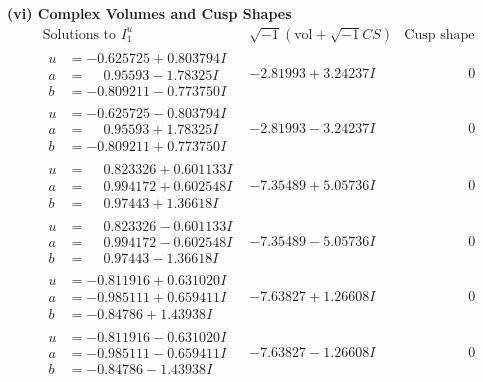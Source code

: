 \documentclass[1p]{elsarticle_modified}
\theoremstyle{definition}
\newcommand{\I}{\sqrt{-1}}
\begin{document}
\newpage\flushleft \textbf{(vi) Complex Volumes and Cusp Shapes}
$$\begin{array}{c|c|c}  
\text{Solutions to }I^u_{1}& \I (\text{vol} + \sqrt{-1}CS) & \text{Cusp shape}\\
 \hline 
\begin{aligned}
u &= -0.625725 + 0.803794 I \\
a &= \phantom{-}0.95593 - 1.78325 I \\
b &= -0.809211 - 0.773750 I\end{aligned}
 & -2.81993 + 3.24237 I & \phantom{-0.000000 } 0 \\ \hline\begin{aligned}
u &= -0.625725 - 0.803794 I \\
a &= \phantom{-}0.95593 + 1.78325 I \\
b &= -0.809211 + 0.773750 I\end{aligned}
 & -2.81993 - 3.24237 I & \phantom{-0.000000 } 0 \\ \hline\begin{aligned}
u &= \phantom{-}0.823326 + 0.601133 I \\
a &= \phantom{-}0.994172 + 0.602548 I \\
b &= \phantom{-}0.97443 + 1.36618 I\end{aligned}
 & -7.35489 + 5.05736 I & \phantom{-0.000000 } 0 \\ \hline\begin{aligned}
u &= \phantom{-}0.823326 - 0.601133 I \\
a &= \phantom{-}0.994172 - 0.602548 I \\
b &= \phantom{-}0.97443 - 1.36618 I\end{aligned}
 & -7.35489 - 5.05736 I & \phantom{-0.000000 } 0 \\ \hline\begin{aligned}
u &= -0.811916 + 0.631020 I \\
a &= -0.985111 + 0.659411 I \\
b &= -0.84786 + 1.43938 I\end{aligned}
 & -7.63827 + 1.26608 I & \phantom{-0.000000 } 0 \\ \hline\begin{aligned}
u &= -0.811916 - 0.631020 I \\
a &= -0.985111 - 0.659411 I \\
b &= -0.84786 - 1.43938 I\end{aligned}
 & -7.63827 - 1.26608 I & \phantom{-0.000000 } 0 \\ \hline\begin{aligned}

\end{aligned}
\end{array}$$
\end{document}

